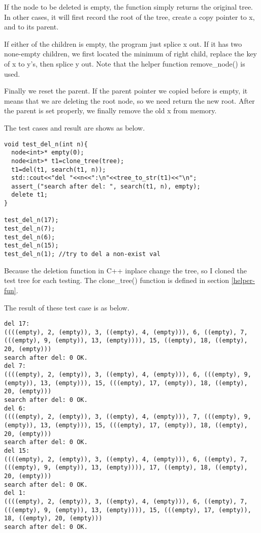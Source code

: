 \documentclass{article}
\begin{document}
If the node to be deleted is empty, the function simply returns the original tree.
In other cases, it will first record the root of the tree, create a copy pointer
to x, and to its parent.

If either of the children is empty, the program just splice x out. If it has two
none-empty children, we first located the minimum of right child, replace the key
of x to y's, then splice y out. Note that the helper function remove\_node() is
used.

Finally we reset the parent. If the parent pointer we copied before is empty, it
means that we are deleting the root node, so we need return the new root. After
the parent is set properly, we finally remove the old x from memory.

The test cases and result are shows as below.

\begin{lstlisting}
void test_del_n(int n){
  node<int>* empty(0);
  node<int>* t1=clone_tree(tree);
  t1=del(t1, search(t1, n));
  std::cout<<"del "<<n<<":\n"<<tree_to_str(t1)<<"\n";
  assert_("search after del: ", search(t1, n), empty);
  delete t1;
}

test_del_n(17);
test_del_n(7);
test_del_n(6);
test_del_n(15);
test_del_n(1); //try to del a non-exist val
\end{lstlisting}

Because the deletion function in C++ inplace change the tree, so I cloned the test 
tree for each testing. The clone\_tree() function is defined in section \ref{helper-fun}.

The result of these test case is as below.
\begin{verbatim}
del 17:
((((empty), 2, (empty)), 3, ((empty), 4, (empty))), 6, ((empty), 7, 
(((empty), 9, (empty)), 13, (empty)))), 15, ((empty), 18, ((empty), 
20, (empty)))
search after del: 0 OK.
del 7:
((((empty), 2, (empty)), 3, ((empty), 4, (empty))), 6, (((empty), 9, 
(empty)), 13, (empty))), 15, (((empty), 17, (empty)), 18, ((empty), 
20, (empty)))
search after del: 0 OK.
del 6:
((((empty), 2, (empty)), 3, ((empty), 4, (empty))), 7, (((empty), 9, 
(empty)), 13, (empty))), 15, (((empty), 17, (empty)), 18, ((empty), 
20, (empty)))
search after del: 0 OK.
del 15:
((((empty), 2, (empty)), 3, ((empty), 4, (empty))), 6, ((empty), 7, 
(((empty), 9, (empty)), 13, (empty)))), 17, ((empty), 18, ((empty), 
20, (empty)))
search after del: 0 OK.
del 1:
((((empty), 2, (empty)), 3, ((empty), 4, (empty))), 6, ((empty), 7, 
(((empty), 9, (empty)), 13, (empty)))), 15, (((empty), 17, (empty)), 
18, ((empty), 20, (empty)))
search after del: 0 OK.
\end{verbatim}
\end{document}
